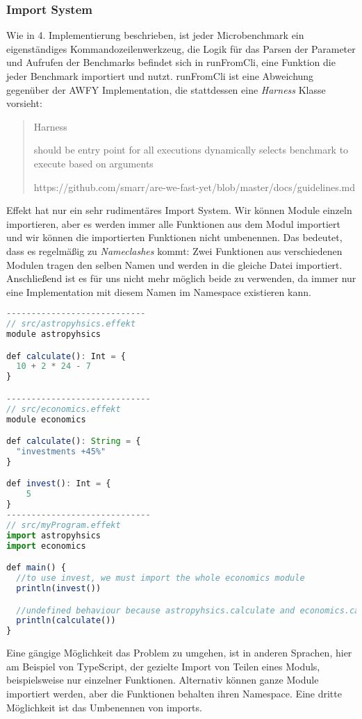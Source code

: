 \subsubsection{ Import System }
Wie in 4. Implementierung %
 beschrieben, ist jeder Microbenchmark ein eigenständiges Kommandozeilenwerkzeug, die Logik für das Parsen der Parameter und Aufrufen der Benchmarks befindet sich in runFromCli, eine Funktion die jeder Benchmark importiert und nutzt.
runFromCli ist eine Abweichung gegenüber der AWFY Implementation, die stattdessen eine \textit{Harness} Klasse vorsieht:
\begin{quote}
    Harness

    should be entry point for all executions
    dynamically selects benchmark to execute based on arguments

    https://github.com/smarr/are-we-fast-yet/blob/master/docs/guidelines.md
\end{quote}
Effekt hat nur ein sehr rudimentäres Import System. Wir können Module einzeln importieren, aber es werden immer alle Funktionen aus dem Modul importiert und wir können die importierten Funktionen nicht umbenennen.
Das bedeutet, dass es regelmäßig zu \textit{Nameclashes} kommt: Zwei Funktionen aus verschiedenen Modulen tragen den selben Namen und werden in die gleiche Datei importiert. Anschließend ist es für uns nicht mehr möglich beide zu verwenden, da immer nur eine Implementation mit diesem Namen im Namespace existieren kann.
\begin{lstlisting}[language=javascript]
----------------------------
// src/astropyhsics.effekt
module astropyhsics

def calculate(): Int = {
  10 + 2 * 24 - 7
}

-----------------------------
// src/economics.effekt
module economics

def calculate(): String = {
  "investments +45%"
}

def invest(): Int = {
    5
}
-----------------------------
// src/myProgram.effekt
import astropyhsics
import economics

def main() {
  //to use invest, we must import the whole economics module
  println(invest())

  //undefined behaviour because astropyhsics.calculate and economics.calculate clash
  println(calculate())
}
\end{lstlisting}

Eine gängige Möglichkeit das Problem zu umgehen, ist in anderen Sprachen, hier am Beispiel von TypeScript, der gezielte Import von Teilen eines Moduls, beispielsweise nur einzelner Funktionen. Alternativ können ganze Module importiert werden, aber die Funktionen behalten ihren Namespace.
Eine dritte Möglichkeit ist das Umbenennen von imports.


